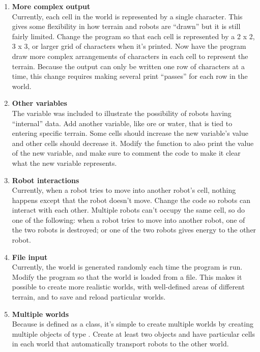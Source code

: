 \begin{enumerate}[{\bf 1.}]
\item {\bf More complex output}\\
Currently, each cell in the world is represented by a single character.  This gives some flexibility in how terrain and robots are ``drawn'' but it is still fairly limited.  Change the program so that each cell is represented by a 2 x 2, 3 x 3, or larger grid of characters when it's printed.  Now have the program draw more complex arrangements of characters in each cell to represent the terrain.  Because the output can only be written one row of characters at a time, this change requires making several print ``passes'' for each row in the world.  

\item {\bf Other variables}\\
 The  variable was included to illustrate the possibility of robots having ``internal'' data.  Add another variable, like ore or water, that is tied to entering specific terrain.  Some cells should increase the new variable's value and other cells should decrease it.  Modify the  function to also print the value of the new variable, and make sure to comment the code to make it clear what the new variable represents.

\item {\bf Robot interactions}\\
 Currently, when a robot tries to move into another robot's cell, nothing happens except that the robot doesn't move.  Change the code so robots can interact with each other.  Multiple robots can't occupy the same cell, so do one of the following: when a robot tries to move into another robot, one of the two robots is destroyed; or one of the two robots gives energy to the other robot.

\item {\bf File input}\\
 Currently, the world is generated randomly each time the program is run.  Modify the program so that the world is loaded from a file.  This makes it possible to create more realistic worlds, with well-defined areas of different terrain, and to save and reload particular worlds.

\item {\bf Multiple worlds}\\
 Because  is defined as a class, it's simple to create multiple worlds by creating multiple objects of type .  Create at least two  objects and have particular cells in each world that automatically transport robots to the other world.


\end{enumerate}
